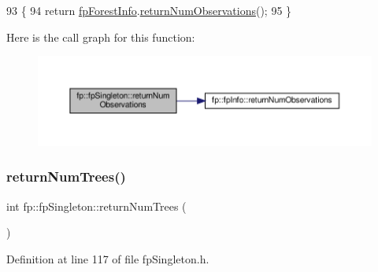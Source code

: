 \begin{DoxyCode}
93                                                     \{
94                 \textcolor{keywordflow}{return} \hyperlink{classfp_1_1fpSingleton_a85965009befa72a749ae498fa5b6ccfa}{fpForestInfo}.\hyperlink{classfp_1_1fpInfo_a8e340d343bc946ffd6be09a001e3e5dd}{returnNumObservations}();
95             \}
\end{DoxyCode}
Here is the call graph for this function\+:
\nopagebreak
\begin{figure}[H]
\begin{center}
\leavevmode
\includegraphics[width=350pt]{classfp_1_1fpSingleton_ae0a2963feb07b809b8740218f1048b67_cgraph}
\end{center}
\end{figure}
\mbox{\label{classfp_1_1fpSingleton_a8be36616345b6b77ce4c60b99cc2b91c}} 
\subsubsection{\texorpdfstring{return\+Num\+Trees()}{returnNumTrees()}}
{\footnotesize\ttfamily int fp\+::fp\+Singleton\+::return\+Num\+Trees (\begin{DoxyParamCaption}{ }\end{DoxyParamCaption})\hspace{0.3cm}{\ttfamily [inline]}}



Definition at line 117 of file fp\+Singleton.\+h.


